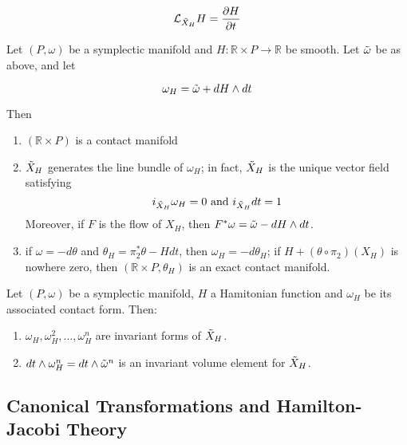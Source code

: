 \begin{prop}

\[
\mathcal{L}_{\Tilde{X}_H}H = \frac{\partial H}{\partial t}
\]

\end{prop}

\begin{thm}

Let $(P,\omega)$ be a symplectic manifold and $H: \mathbb{R} \times P \to \mathbb{R}$ be smooth. Let $\Tilde{\omega}$ be as above, and let 

\[\omega_H = \Tilde{\omega} + dH \wedge dt\]

Then

\begin{enumerate}
    \item $(\mathbb{R} \times P)$ is a contact manifold
    \item $\Tilde{X}_H$ generates the line bundle of $\omega_H$; in fact, $\Tilde{X}_H$ is the unique vector field satisfying
    \[    i_{\Tilde{X}_H}\omega_H = 0 \text{ and } i_{\Tilde{X}_H} dt = 1\]
    Moreover, if $F$ is the flow of $X_H$, then $F^* \omega = \Tilde{\omega} - dH \wedge dt$.
    \item if $\omega = - d \theta$ and $\theta_H = \pi_2^* \theta - H dt$, then $\omega_H=-d\theta_H$; if $H + (\theta \circ \pi_2)(X_H)$ is nowhere zero, then $(\mathbb{R} \times P, \theta_H)$ is an exact contact manifold.
\end{enumerate}
\end{thm}

\begin{thm}

Let $(P,\omega)$ be a symplectic manifold, $H$ a Hamitonian function and $\omega_H$ be its associated contact form. Then:

\begin{enumerate}
    \item $\omega_H, \omega_H^2, \ldots, \omega_H^n$ are invariant forms of $\Tilde{X}_H$.
    \item $dt \wedge \omega_H^n = dt \wedge \Tilde{\omega}^n$ is an invariant volume element for $\Tilde{X}_H$.
\end{enumerate}
\end{thm}

\subsection{Canonical Transformations and Hamilton-Jacobi Theory}

